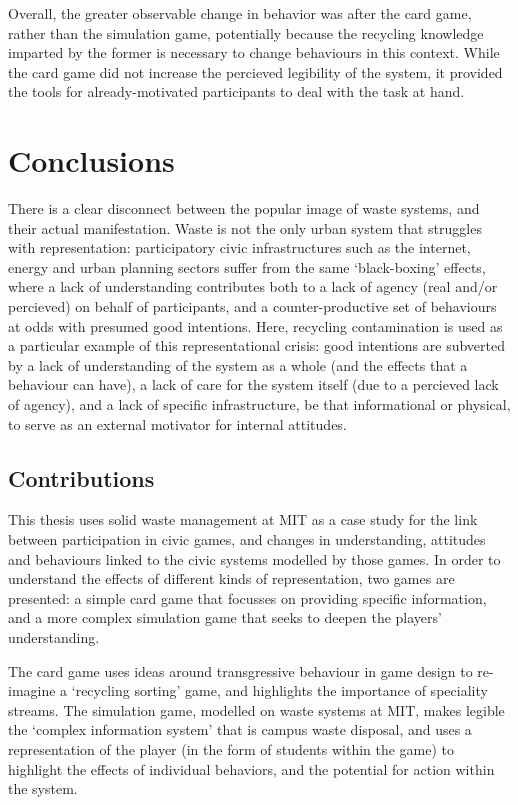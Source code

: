 \documentclass[nofonts,nols,justified,nobib]{tufte-book}
\begin{document}
Overall, the greater observable change in behavior was after the card game, rather than the simulation game, potentially because the recycling knowledge imparted by the former is necessary to change behaviours in this context. While the card game did not increase the percieved legibility of the system, it provided the tools for already-motivated participants to deal with the task at hand. 

\chapter*{Conclusions}

There is a clear disconnect between the popular image of waste systems, and their actual manifestation. Waste is not the only urban system that struggles with representation: participatory civic infrastructures such as the internet, energy \cite{onuoha_i_2016} and urban planning sectors suffer from the same `black-boxing' effects, where a lack of understanding contributes both to a lack of agency (real and/or percieved) on behalf of participants, and a counter-productive set of behaviours at odds with presumed good intentions. Here, recycling contamination is used as a particular example of this representational crisis: good intentions are subverted by a lack of understanding of the system as a whole (and the effects that a behaviour can have), a lack of care for the system itself (due to a percieved lack of agency), and a lack of specific infrastructure, be that informational or physical, to serve as an external motivator for internal attitudes.


\section*{Contributions}
This thesis uses solid waste management at MIT as a case study for the link between participation in civic games, and changes in understanding, attitudes and behaviours linked to the civic systems modelled by those games. In order to understand the effects of different kinds of representation, two games are presented: a simple card game that focusses on providing specific information, and a more complex simulation game that seeks to deepen the players' understanding.

The card game uses ideas around transgressive behaviour in game design to re-imagine a `recycling sorting' game, and highlights the importance of speciality streams. The  simulation game, modelled on waste systems at MIT, makes legible the `complex information system' that is campus waste disposal, and uses a representation of the player (in the form of students within the game) to highlight the effects of individual behaviors, and the potential for action within the system. 
\end{document}
